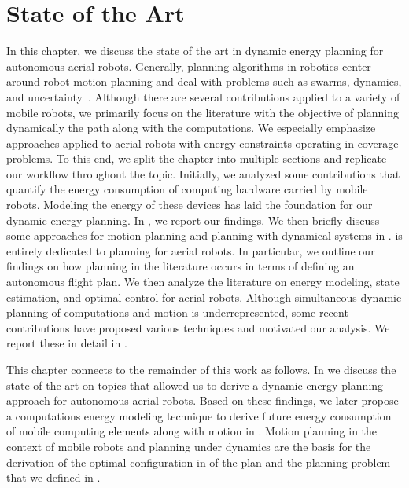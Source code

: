 
\chapter{State of the Art}
\label{cp:soa}

In this chapter, we discuss the state of the art in dynamic energy planning for autonomous aerial robots. Generally, planning algorithms in robotics center around robot motion planning and deal with problems such as swarms, dynamics, and uncertainty~\citep{lavalle2006planning}. Although there are several contributions applied to a variety of mobile robots, we primarily focus on the literature with the objective of planning dynamically the path along with the computations. We especially emphasize approaches applied to aerial robots with energy constraints operating in coverage problems. To this end, we split the chapter into multiple sections and replicate our workflow throughout the topic. Initially, we analyzed some contributions that quantify the energy consumption of computing hardware carried by mobile robots. Modeling the energy of these devices has laid the foundation for our dynamic energy planning. In , we report our findings. We then briefly discuss some approaches for motion planning and planning with dynamical systems in .  is entirely dedicated to planning for aerial robots. In particular, we outline our findings on how planning in the literature occurs in terms of defining an autonomous flight plan. We then analyze the literature on energy modeling, state estimation, and optimal control for aerial robots. Although simultaneous dynamic planning of computations and motion is underrepresented, some recent contributions have proposed various techniques and motivated our analysis. We report these in detail in .

This chapter connects to the remainder of this work as follows. In  we discuss the state of the art on topics that allowed us to derive a dynamic energy planning approach for autonomous aerial robots. Based on these findings, we later propose a computations energy modeling technique to derive future energy consumption of mobile computing elements along with motion in . Motion planning in the context of mobile robots and planning under dynamics are the basis for the derivation of the optimal configuration in  of the plan and the planning problem that we defined in .       


